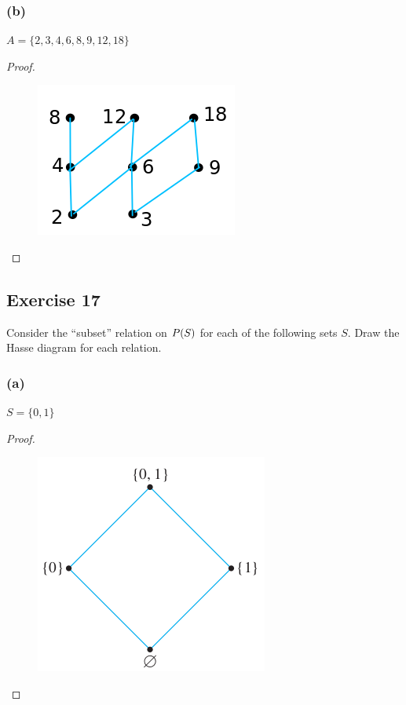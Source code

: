 \documentclass[14pt]{extarticle}
\let\mathscr\relax
\newcommand{\ps}{\mathscr{P}} %
\begin{document}
\subsubsection{(b)}
\(A = \{2, 3, 4, 6, 8, 9, 12, 18\}\)

\begin{proof}
\begin{figure}[ht!]
\centering
\includegraphics[scale=0.5]{../images/8.5.16.b.png}
\end{figure}
\end{proof}

\subsection{Exercise 17}
Consider the “subset” relation on \(\ps(S)\) for each of the following sets $S$. 
Draw the Hasse diagram for each relation.

\subsubsection{(a)}
\(S = \{0, 1\}\)

\begin{proof}
\begin{figure}[ht!]
\centering
\includegraphics[scale=0.4]{../images/8.5.17.a.png}
\end{figure}
\end{proof}
\end{document}
